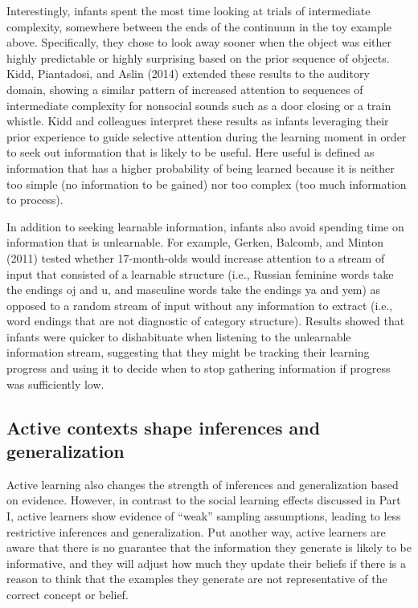 \documentclass[english,floatsintext,man]{apa6}
\theoremstyle{definition}
\theoremstyle{definition}
\theoremstyle{definition}
\theoremstyle{remark}
\begin{document}
Interestingly, infants spent the most time looking at trials of
intermediate complexity, somewhere between the ends of the continuum in
the toy example above. Specifically, they chose to look away sooner when
the object was either highly predictable or highly surprising based on
the prior sequence of objects. Kidd, Piantadosi, and Aslin (2014)
extended these results to the auditory domain, showing a similar pattern
of increased attention to sequences of intermediate complexity for
nonsocial sounds such as a door closing or a train whistle. Kidd and
colleagues interpret these results as infants leveraging their prior
experience to guide selective attention during the learning moment in
order to seek out information that is likely to be useful. Here useful
is defined as information that has a higher probability of being learned
because it is neither too simple (no information to be gained) nor too
complex (too much information to process).

In addition to seeking learnable information, infants also avoid
spending time on information that is unlearnable. For example, Gerken,
Balcomb, and Minton (2011) tested whether 17-month-olds would increase
attention to a stream of input that consisted of a learnable structure
(i.e., Russian feminine words take the endings oj and u, and masculine
words take the endings ya and yem) as opposed to a random stream of
input without any information to extract (i.e., word endings that are
not diagnostic of category structure). Results showed that infants were
quicker to dishabituate when listening to the unlearnable information
stream, suggesting that they might be tracking their learning progress
and using it to decide when to stop gathering information if progress
was sufficiently low.

\subsection{Active contexts shape inferences and
generalization}\label{active-contexts-shape-inferences-and-generalization}

Active learning also changes the strength of inferences and
generalization based on evidence. However, in contrast to the social
learning effects discussed in Part I, active learners show evidence of
\enquote{weak} sampling assumptions, leading to less restrictive
inferences and generalization. Put another way, active learners are
aware that there is no guarantee that the information they generate is
likely to be informative, and they will adjust how much they update
their beliefs if there is a reason to think that the examples they
generate are not representative of the correct concept or belief.
\end{document}
